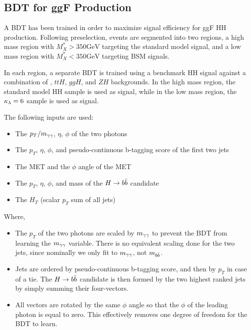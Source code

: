 \subsection{BDT for ggF Production} \label{ssec:ggf-bdt}
A \gls{BDT} has been trained in order to maximize signal efficiency for ggF HH production. Following preselection, events are segmented into two regions, a high mass region with $M_X^{*} > 350 \text{GeV}$ targeting the standard model signal, and a low mass region with $M_X^{*} < 350 \text{GeV}$ targeting BSM signals. 

In each region, a separate BDT is trained using a benchmark HH signal against a combination of \yy, $ttH$, $ggH$, and $ZH$ backgrounds. In the high mass region, the standard model HH sample is used as signal, while in the low mass region, the $\kappa_{\lambda} = 6$ sample is used as signal.

The following inputs are used:

\begin{itemize}
	\item{The $p_{T}/m_{\gamma\gamma}$, $\eta$, $\phi$ of the two photons} 
	\item{The $p_{T}$, $\eta$, $\phi$, and pseudo-continuous b-tagging score of the first two jets}
	\item{The MET and the $\phi$ angle of the MET}
	\item{The $p_{T}$, $\eta$, $\phi$, and mass of the $H\rightarrow b\bar{b}$ candidate}
	\item{The $H_{T}$ (scalar $p_{T}$ sum of all jets)}
\end{itemize}

Where,

\begin{itemize}
	\item{The $p_{T}$ of the two photons are scaled by $m_{\gamma\gamma}$ to prevent the BDT from learning the $m_{\gamma\gamma}$ variable. There is no equivalent scaling done for the two jets, since nominally we only fit to $m_{\gamma\gamma}$, not $m_{b\bar{b}}$.}
	\item{Jets are ordered by pseudo-continuous b-tagging score, and then by $p_{T}$ in case of a tie. The $H \rightarrow b\bar{b}$ candidate is then formed by the two highest ranked jets by simply summing their four-vectors.}
	\item{All vectors are rotated by the same $\phi$ angle so that the $\phi$ of the leading photon is equal to zero. This effectively removes one degree of freedom for the BDT to learn.}
\end{itemize}

